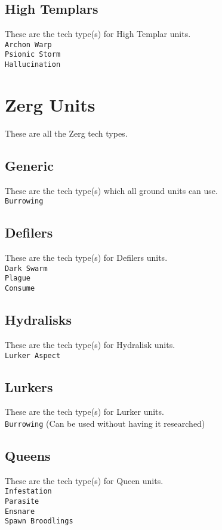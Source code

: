 \subsection{High Templars}
These are the tech type(s) for High Templar units. \\
\verb|Archon Warp| \\
\verb|Psionic Storm| \\
\verb|Hallucination|

\section{Zerg Units}
These are all the Zerg tech types.

\subsection{Generic}
These are the tech type(s) which all ground units can use. \\
\verb|Burrowing| \\

\subsection{Defilers}
These are the tech type(s) for Defilers units. \\
\verb|Dark Swarm| \\
\verb|Plague| \\
\verb|Consume| 

\subsection{Hydralisks}
These are the tech type(s) for Hydralisk units. \\
\verb|Lurker Aspect|

\subsection{Lurkers}
These are the tech type(s) for Lurker units. \\ 
\verb|Burrowing| (Can be used without having it researched)

\subsection{Queens}
These are the tech type(s) for Queen units. \\ 
\verb|Infestation| \\
\verb|Parasite| \\
\verb|Ensnare| \\
\verb|Spawn Broodlings| \\